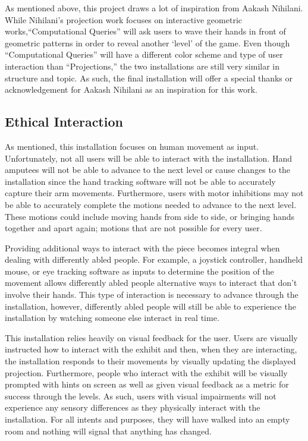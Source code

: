 \documentclass[10pt,twocolumn]{article}
\begin{document}
As mentioned above, this project draws a lot of inspiration from Aakash Nihilani.  While Nihilani's projection work focuses on interactive geometric works,``Computational Queries'' will ask users to wave their hands in front of geometric patterns in order to reveal another `level' of the game.  Even though ``Computational Queries'' will have a different color scheme and type of user interaction than ``Projections,'' the two installations are still very similar in structure and topic.  As such, the final installation will offer a special thanks or acknowledgement for Aakash Nihilani as an inspiration for this work. 

\subsection{Ethical Interaction}\label{sec:interaction}

As mentioned, this installation focuses on human movement as input.  Unfortunately, not all users will be able to interact with the installation.  Hand amputees will not be able to advance to the next level or cause changes to the installation since the hand tracking software will not be able to accurately capture their arm movements. Furthermore, users with motor inhibitions may not be able to accurately complete the motions needed to advance to the next level.  These motions could include moving hands from side to side, or bringing hands together and apart again; motions that are not possible for every user. 

Providing additional ways to interact with the piece becomes integral when dealing with differently abled people. For example, a joystick controller, handheld mouse, or eye tracking software as inputs to determine the position of the movement allows differently abled people alternative ways to interact that don't involve their hands. This type of interaction is necessary to advance through the installation, however, differently abled people will still be able to experience the installation by watching someone else interact in real time.

This installation relies heavily on visual feedback for the user.  Users are visually instructed how to interact with the exhibit and then, when they are interacting, the installation responds to their movements by visually updating the displayed projection.  Furthermore, people who interact with the exhibit will be visually prompted with hints on screen as well as given visual feedback as a metric for success through the levels. As such, users with visual impairments will not experience any sensory differences as they physically interact with the installation.  For all intents and purposes, they will have walked into an empty room and nothing will signal that anything has changed. 
\end{document}
